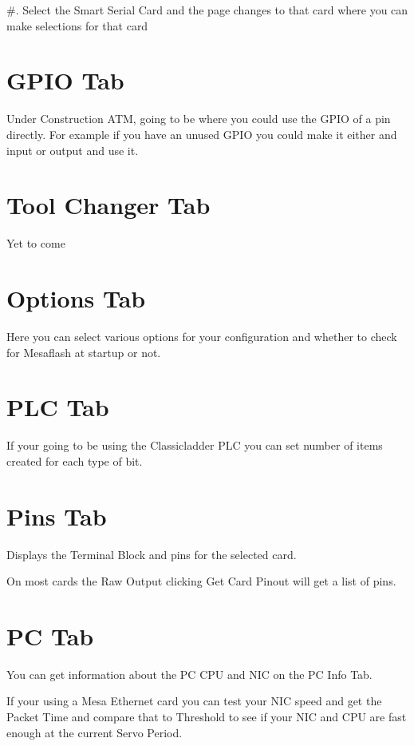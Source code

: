 \documentclass[letterpaper,10pt,english,openany,oneside]{sphinxmanual}
\begin{document}
\#. Select the Smart Serial Card and the page changes to that card where
you can make selections for that card


\section{GPIO Tab}
\label{\detokenize{basic:gpio-tab}}
Under Construction ATM, going to be where you could use the GPIO of a
pin directly. For example if you have an unused GPIO you could make it
either and input or output and use it.


\section{Tool Changer Tab}
\label{\detokenize{basic:tool-changer-tab}}
Yet to come


\section{Options Tab}
\label{\detokenize{basic:options-tab}}
Here you can select various options for your configuration and whether
to check for Mesaflash at startup or not.


\section{PLC Tab}
\label{\detokenize{basic:plc-tab}}
If your going to be using the Classicladder PLC you can set number of
items created for each type of bit.


\section{Pins Tab}
\label{\detokenize{basic:pins-tab}}
Displays the Terminal Block and pins for the selected card.

On most cards the Raw Output clicking Get Card Pinout will get a list of
pins.


\section{PC Tab}
\label{\detokenize{basic:pc-tab}}
You can get information about the PC CPU and NIC on the PC Info Tab.

If your using a Mesa Ethernet card you can test your NIC speed and get
the Packet Time and compare that to Threshold to see if your NIC and CPU
are fast enough at the current Servo Period.
\end{document}
